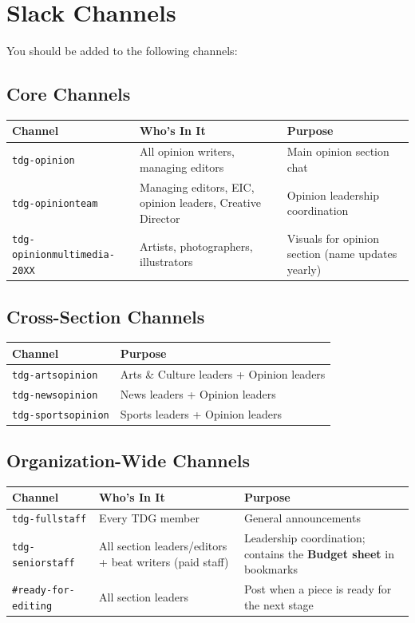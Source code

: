 \documentclass[12pt]{article}
\newlength{\tblwidth}
\begin{document}
\section{Slack Channels}

You should be added to the following channels:

\subsection{Core Channels}

\begin{longtable}{p{0.38\tblwidth} p{0.30\tblwidth} p{0.28\tblwidth}}
\toprule
\textbf{Channel} & \textbf{Who's In It} & \textbf{Purpose} \\
\midrule
\texttt{tdg-opinion} & All opinion writers, managing editors & Main opinion section chat \\
\texttt{tdg-opinionteam} & Managing editors, EIC, opinion leaders, Creative Director & Opinion leadership coordination \\
\texttt{tdg-opinionmultimedia-20XX} & Artists, photographers, illustrators & Visuals for opinion section (name updates yearly) \\
\bottomrule
\end{longtable}

\subsection{Cross-Section Channels}

\begin{longtable}{p{0.38\tblwidth} p{0.58\tblwidth}}
\toprule
\textbf{Channel} & \textbf{Purpose} \\
\midrule
\texttt{tdg-artsopinion} & Arts \& Culture leaders + Opinion leaders \\
\texttt{tdg-newsopinion} & News leaders + Opinion leaders \\
\texttt{tdg-sportsopinion} & Sports leaders + Opinion leaders \\
\bottomrule
\end{longtable}

\subsection{Organization-Wide Channels}

\begin{longtable}{p{0.30\tblwidth} p{0.35\tblwidth} p{0.30\tblwidth}}
\toprule
\textbf{Channel} & \textbf{Who's In It} & \textbf{Purpose} \\
\midrule
\texttt{tdg-fullstaff} & Every TDG member & General announcements \\
\texttt{tdg-seniorstaff} & All section leaders/editors + beat writers (paid staff) & Leadership coordination; contains the \textbf{Budget sheet} in bookmarks \\
\texttt{\#ready-for-editing} & All section leaders & Post when a piece is ready for the next stage \\
\bottomrule
\end{longtable}
\end{document}

